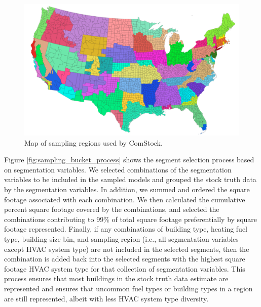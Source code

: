 \begin{figure}[hbt!]
  \centering \includegraphics[width=1\textwidth]{figures/sampling_regions.png}
  \caption{Map of sampling regions used by ComStock.}
   \label{fig:sampling_regions}
\end{figure}

Figure \ref{fig:sampling_bucket_process} shows the segment selection process based on segmentation variables. We selected combinations of the segmentation variables to be included in the sampled models and grouped the stock truth data by the segmentation variables. In addition, we summed and ordered the square footage associated with each combination. We then calculated the cumulative percent square footage covered by the combinations, and selected the combinations contributing to 99\% of total square footage preferentially by square footage represented. Finally, if any combinations of building type, heating fuel type, building size bin, and sampling region (i.e., all segmentation variables except HVAC system type) are not included in the selected segments, then the combination is added back into the selected segments with the highest square footage HVAC system type for that collection of segmentation variables. This process ensures that most buildings in the stock truth data estimate are represented and ensures that uncommon fuel types or building types in a region are still represented, albeit with less HVAC system type diversity.

